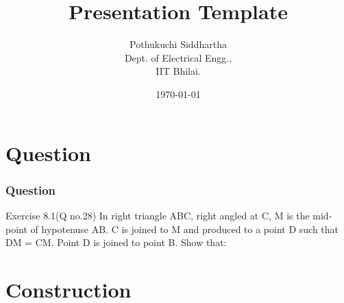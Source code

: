 \documentclass{beamer}
\title{Presentation Template}
\author{Pothukuchi Siddhartha \\ Dept. of Electrical Engg.,\\IIT Bhilai.}
\date{\today}
\theoremstyle{remark}
\numberwithin{equation}{section}
\begin{document}
\begin{frame}
\titlepage
\end{frame}
\section{Question}
\begin{frame}
\frametitle{Question}
\begin{block}{Exercise 8.1(Q no.28)}
In right triangle ABC, right angled at C, M is
the mid-point of hypotenuse AB. C is joined to
M and produced to a point D such that DM =
CM. Point D is joined to point B. Show that:
\newline
\hyperlink{abcd}{}
\newline
\hyperlink{abcd}{}
\newline
\hyperlink{abcd}{}
\newline
\hyperlink{abcd}{}

\end{block}
\end{frame}

\section{\textbf{Construction}}
\end{document}
